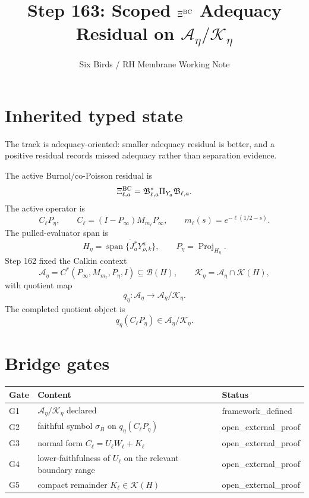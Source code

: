 \documentclass[11pt]{article}
\title{Step 163: Scoped \(\Xi^{\rm BC}\) Adequacy Residual on \(\mathcal A_\eta/\mathcal K_\eta\)}
\author{Six Birds / RH Membrane Working Note}
\date{}
\begin{document}
\maketitle

\section{Inherited typed state}

The track is adequacy-oriented: smaller adequacy residual is better, and a
positive residual records missed adequacy rather than separation evidence.

The active Burnol/co-Poisson residual is
\[
  \Xi^{\rm BC}_{\ell,a}
  =
  \mathfrak B_{\ell,a}^{*}\Pi_{Y_a}\mathfrak B_{\ell,a}.
\]
The active operator is
\[
  C_\ell P_\eta,
  \qquad
  C_\ell=(I-P_\infty)M_{m_\ell}P_\infty,
  \qquad
  m_\ell(s)=e^{-\ell(1/2-s)}.
\]
The pulled-evaluator span is
\[
  H_\eta=
  \overline{\operatorname{span}\{J_a^*Y^a_{\rho,k}\}},
  \qquad
  P_\eta=\operatorname{Proj}_{H_\eta}.
\]
Step 162 fixed the Calkin context
\[
  \mathcal A_\eta=C^*(P_\infty,M_{m_\ell},P_\eta,I)\subseteq\mathcal B(H),
  \qquad
  \mathcal K_\eta=\mathcal A_\eta\cap\mathcal K(H),
\]
with quotient map
\[
  q_\eta:\mathcal A_\eta\to\mathcal A_\eta/\mathcal K_\eta.
\]
The completed quotient object is
\[
  q_\eta(C_\ell P_\eta)\in\mathcal A_\eta/\mathcal K_\eta.
\]

\section{Bridge gates}

\begin{center}
\begin{tabular}{lll}
\hline
Gate & Content & Status\\
\hline
G1 & \(\mathcal A_\eta/\mathcal K_\eta\) declared & framework\_defined\\
G2 & faithful symbol \(\sigma_B\) on \(q_\eta(C_\ell P_\eta)\) & open\_external\_proof\\
G3 & normal form \(C_\ell=U_\ell W_\ell+K_\ell\) & open\_external\_proof\\
G4 & lower-faithfulness of \(U_\ell\) on the relevant boundary range & open\_external\_proof\\
G5 & compact remainder \(K_\ell\in\mathcal K(H)\) & open\_external\_proof\\
\hline
\end{tabular}
\end{center}
\end{document}
